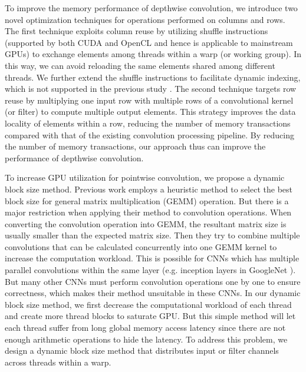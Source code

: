 To improve the memory performance of depthwise convolution, we introduce two novel optimization techniques for operations performed on columns and rows.
The first technique exploits column reuse by utilizing shuffle instructions (supported by both CUDA and OpenCL and hence is applicable to mainstream GPUs) to exchange elements among threads within a warp (or working group).
In this way, we can avoid reloading the same elements shared among different threads.
We further extend the shuffle instructions to facilitate dynamic indexing, which is not supported in the previous study \cite{vasilache2014fast}.
The second technique targets row reuse by multiplying one input row with multiple rows of a convolutional kernel (or filter) to compute multiple output elements.
This strategy improves the data locality of elements within a row, reducing the number of memory transactions compared with that of the existing convolution processing pipeline.
By reducing the number of memory transactions, our approach thus can improve the performance of depthwise convolution.

To increase GPU utilization for pointwise convolution, we propose a dynamic block size method.
Previous work \cite{li2019coordinated,pourghassemi2020limits} employs a heuristic method to select the best block size for general matrix multiplication (GEMM) operation.
But there is a major restriction when applying their method to convolution operations.
When converting the convolution operation into GEMM, the resultant matrix size is usually smaller than the expected matrix size.
Then they try to combine multiple convolutions that can be calculated concurrently into one GEMM kernel to increase the computation workload.
This is possible for CNNs which has multiple parallel convolutions within the same layer (e.g. inception layers in GoogleNet \cite{szegedy2015going}).
But many other CNNs must perform convolution operations one by one to ensure correctness, which makes their method unsuitable in these CNNs.
In our dynamic block size method, we first decrease the computational workload of each thread and create more thread blocks to saturate GPU.
But this simple method will let each thread suffer from long global memory access latency since there are not enough arithmetic operations to hide the latency.
To address this problem, we design a dynamic block size method that distributes input or filter channels across threads within a warp.

